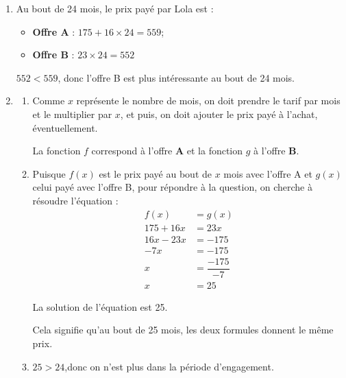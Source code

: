 \begin{enumerate}
	\item Au bout de 24 mois, le prix payé par Lola est :
	\begin{itemize}
		\item \textbf{Offre A} : \quad $175+16\times 24=559$;
		\item \textbf{Offre B} : \quad $23\times 24=552$
	\end{itemize}

	$552 < 559$, \quad donc l'offre B est plus intéressante au bout de 24 mois.

	\item \begin{enumerate}
		\item Comme $x$ représente le nombre de mois, on doit prendre le tarif par mois et le multiplier par $x$, et puis, on doit ajouter le prix payé à l'achat, éventuellement.

		La fonction $f$ correspond à l'offre \textbf{A} et la fonction $g$ à l'offre \textbf{B}.

		\item Puisque $f(x)$ est le prix payé au bout de $x$ mois avec l'offre A et $g(x)$ celui payé avec l'offre B, pour répondre à la question, on cherche à résoudre l'équation :
		\begin{align*}
		f(x)&=g(x)\\
		175+16x&=23x\\
		16x-23x&=-175\\
		-7x&=-175\\
		x&=\dfrac{-175}{-7}\\
		x&=25
		\end{align*}

		La solution de l'équation est 25.

		Cela signifie qu'au bout de 25 mois, les deux formules donnent le même prix.

		\item $25>24$,\quad donc on n'est plus dans la période d'engagement.
	\end{enumerate}
\end{enumerate}
